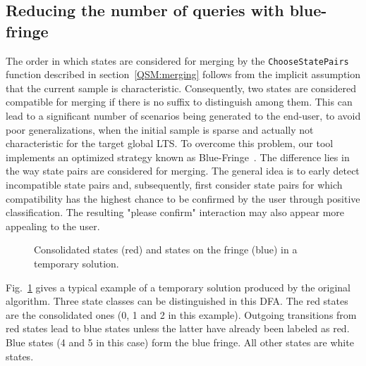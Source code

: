 \subsection{Reducing the number of queries with blue-fringe\label{BlueFringe}}

The order in which states are considered for merging by the \texttt{ChooseStatePairs} function described in section~\ref{QSM:merging} follows from the implicit assumption that the current sample is characteristic. Consequently, two states are considered compatible for merging if there is no suffix to distinguish among them. This can lead to a significant number of scenarios being generated to the end-user, to avoid poor generalizations, when the initial sample is sparse and actually not characteristic for the target global LTS. To overcome this problem, our tool implements an optimized strategy known as Blue-Fringe~\cite{Lang:1998}. The difference lies in the way state pairs are considered for merging. The general idea is to early detect incompatible state pairs and, subsequently, first consider state pairs for which compatibility has the highest chance to be confirmed by the user through positive classification. The resulting "please confirm" interaction may also appear more appealing to the user.

\begin{figure}[H]
\hspace*{-1cm}
\vspace*{-.5cm}
\caption{Consolidated states (red) and states on the fringe (blue) in a temporary solution\label{Fig:BlueFringe}.}
\end{figure}

\noindent
 Fig.~\ref{Fig:BlueFringe} gives a typical example of a temporary solution produced by the original algorithm. Three state classes can be distinguished in this DFA. The red states are the consolidated ones (0, 1 and 2 in this example). Outgoing transitions from red states lead to blue states unless the latter have already been labeled as red. Blue states (4 and 5 in this case) form the blue fringe. All other states are white states. 

